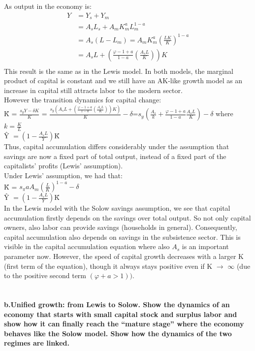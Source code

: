 \documentclass{article}
\begin{document}
As output in the economy is: 
\begin{align}
Y & = Y_s + Y_m		\\
& = A_sL_s + A_mK^a_mL^{1-a}_m		\\
& = A_s(L-L_m) = A_mK^a_m(\frac{LK}{K})^{1-a}		\\
& = A_sL + (\frac{{\varphi}-1+a}{1-a} (\frac{A_sL}{K}))K		\\
\end{align}
This result is the same as in the Lewis model. In both models, the marginal product of capital is constant and we still have an AK-like growth model as an increase in capital still attracts labor to the modern sector. \\
However the transition dynamics for capital change: \\
{\^K} = $\frac{s_yY-{\delta}K}{K}$ = $\frac{s_y(A_sL+(\frac{{\varphi}-1+a}{1-a}(\frac{A_sL}{K}))K)}{K} -{\delta}$=$s_y(\frac{A_s}{k}+\frac{{\varphi}-1+a}{1-a}\frac{A_sL}{K})-{\delta}$ where $k=\frac{K}{L}$ \\
{\^Y} $= (1-\frac{A_sL}{Y})${\^K} \\
Thus, capital accumulation differs considerably under the assumption that savings are now a fixed part of total output, instead of a fixed part of the capitalists’ profits (Lewis’ assumption). \\ 
Under Lewis’ assumption, we had that: \\
{\^K} = $s_{\pi}aA_m({\frac{L}{K}})^{1-a} - \delta $ 		\\
{\^Y} $= (1-\frac{A_sL}{Y})${\^K} \\
In the Lewis model with the Solow savings assumption, we see that capital accumulation firstly depends on the savings over total output. So not only capital owners, also labor can provide savings (households in general). Consequently, capital accumulation also depends on savings in the subsistence sector. This is visible in the capital accumulation equation where also $A_s$ is an important parameter now. However, the speed of capital growth decreases with a larger K (first term of the equation), though it always stays positive even if K $\rightarrow$ $\infty$ (due to the positive second term $({\varphi}+ a >1))$.
\\
\\
\\
\textbf {
b.Unified growth: from Lewis to Solow. Show the dynamics of an economy that starts with small capital stock and surplus labor and show how it can finally reach the “mature stage” where the economy behaves like the Solow model. Show how the dynamics of the two regimes are linked.} \\
\end{document}
